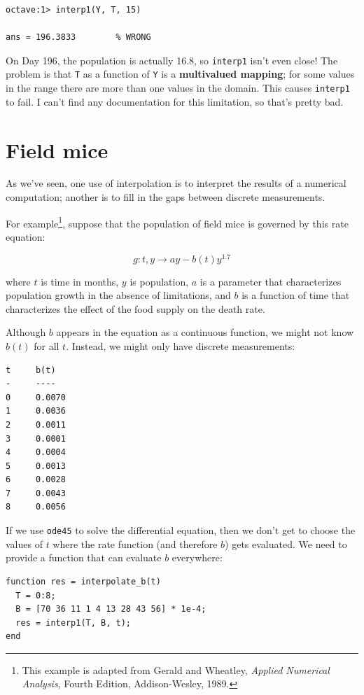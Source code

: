 \documentclass{book}
\begin{document}
\begin{verbatim}
octave:1> interp1(Y, T, 15)     

ans = 196.3833        % WRONG
\end{verbatim}

On Day 196, the population is actually 16.8, so {\tt interp1} isn't
even close! The problem is that {\tt T} as a function of {\tt Y} is a
{\bf multivalued mapping}; for some values in the range there are more
than one values in the domain. This causes {\tt interp1} to fail. I
can't find any documentation for this limitation, so that's pretty
bad.


\section{Field mice}

As we've seen, one use of interpolation is to interpret the results
of a numerical computation; another is to fill in the gaps between
discrete measurements.

For example\footnote{This example is adapted from Gerald and Wheatley,
{\em Applied Numerical Analysis}, Fourth Edition, Addison-Wesley,
1989.}, suppose that the population of field mice is governed by this
rate equation:

\[ g : t,y \to ay - b(t) y^{1.7} \]

where $t$ is time in months, $y$ is population, $a$ is a parameter
that characterizes population growth in the absence of limitations,
and $b$ is a function of time that characterizes the effect of the
food supply on the death rate.

Although $b$ appears in the equation as a continuous function, we
might not know $b(t)$ for all $t$. Instead, we might only have discrete
measurements:

\begin{verbatim}
t     b(t)
-     ----
0     0.0070
1     0.0036       
2     0.0011
3     0.0001
4     0.0004
5     0.0013
6     0.0028
7     0.0043
8     0.0056
\end{verbatim}

If we use {\tt ode45} to solve the differential equation, then we
don't get to choose the values of $t$ where the rate function
(and therefore $b$) gets evaluated. We need to provide a function
that can evaluate $b$ everywhere:

\begin{verbatim}
function res = interpolate_b(t)
  T = 0:8;
  B = [70 36 11 1 4 13 28 43 56] * 1e-4;
  res = interp1(T, B, t);
end
\end{verbatim}
\end{document}
